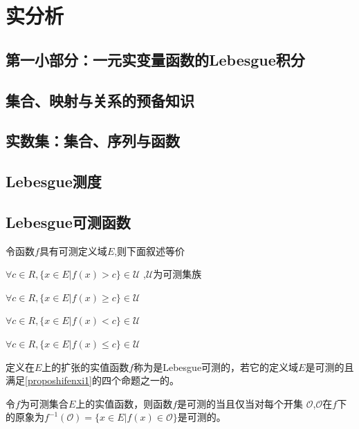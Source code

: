 \documentclass[12pt, a4paper, oneside, UTF8]{ctexbook}
\begin{document}
\else
\fi

\chapter{实分析}
\section*{第一小部分：一元实变量函数的Lebesgue积分}
\section*{集合、映射与关系的预备知识}

\section{实数集：集合、序列与函数}

\section{Lebesgue测度}


\section{Lebesgue可测函数}
\begin{proposition}\label{proposhifenxi1}
	令函数$f$具有可测定义域$E$,则下面叙述等价
	\begin{change}
		\item $\forall c \in R,\{x\in E| f(x)>c\} \in \mathscr{U}$ ,$\mathscr{U}$为可测集族  
		\item $\forall c \in R,\{x\in E| f(x)\geqslant c\} \in \mathscr{U}$
		\item $\forall c \in R,\{x\in E| f(x)<c\} \in \mathscr{U}$
		\item $\forall c \in R,\{x\in E| f(x)\leqslant  c\} \in \mathscr{U}$
	\end{change}
\end{proposition}

\begin{defn}
	定义在$E$上的扩张的实值函数$f$称为是Lebesgue可测的，若它的定义域$E$是可测的且满足\cref{proposhifenxi1}的四个命题之一的。
\end{defn}

\begin{proposition}
	令$f$为可测集合$E$上的实值函数，则函数$f$是可测的当且仅当对每个开集 %
	$\mathcal{O}$,$\mathcal{O}$在$f$下的原象为$f^{-1}(\mathcal{O})=\{x \in E|f(x) \in \mathcal{O}\}$是可测的。
\end{proposition}		
\end{document}
